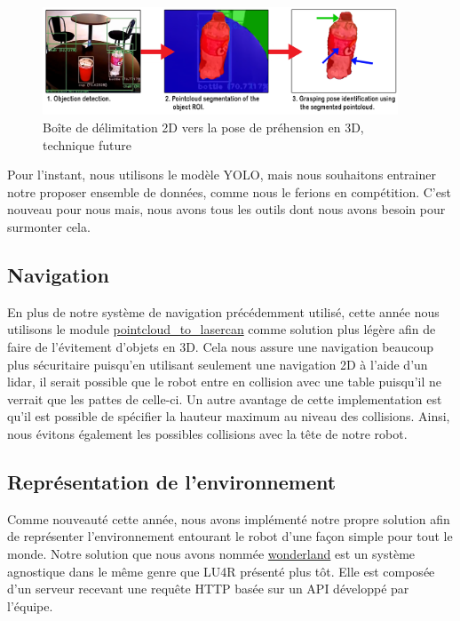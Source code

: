 \documentclass[runningheads,a4paper]{llncs}
\begin{document}
\begin{figure}
  \centering
  \includegraphics[width=300pt]{images/frame_to_box2.png}
  \caption{Boîte de délimitation 2D vers la pose de préhension en 3D, technique future}
\end{figure}

Pour l'instant, nous utilisons le modèle YOLO, mais nous souhaitons entrainer notre proposer ensemble de données, comme nous le ferions en compétition. C'est nouveau pour nous mais, nous avons tous les outils dont nous avons besoin pour surmonter cela. \\

\subsection{Navigation}
En plus de notre système de navigation précédemment utilisé, cette année nous utilisons le module \href{http://wiki.ros.org/pointcloud_to_laserscan}{pointcloud\_to\_lasercan} comme solution plus légère afin de faire de l'évitement d'objets en 3D. Cela nous assure une navigation beaucoup plus sécuritaire puisqu'en utilisant seulement une navigation 2D à l'aide d'un lidar, il serait possible que le robot entre en collision avec une table puisqu'il ne verrait que les pattes de celle-ci. Un autre avantage de cette implementation est qu'il est possible de spécifier la hauteur maximum au niveau des collisions. Ainsi, nous évitons également les possibles collisions avec la tête de notre robot. \\

\subsection{Représentation de l'environnement}
Comme nouveauté cette année, nous avons implémenté notre propre solution afin de représenter l'environnement entourant le robot d'une façon simple pour tout le monde. Notre solution que nous avons nommée \href{http://github.com/walkingmachine/wonderland}{wonderland} est un système agnostique dans le même genre que LU4R présenté plus tôt. Elle est composée d'un serveur recevant une requête HTTP basée sur un API développé par l'équipe.\\
\end{document}

